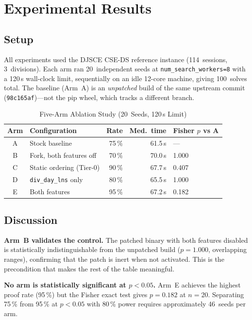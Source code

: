 \documentclass[conference]{IEEEtran}
\begin{document}
\section{Experimental Results}\label{sec:results}

\subsection{Setup}
All experiments used the DJSCE CSE-DS reference instance
(114~sessions, 3~divisions). Each arm ran 20~independent seeds at
\texttt{num\_search\_workers=8} with a 120\,s wall-clock limit, sequentially
on an idle 12-core machine, giving 100~solves total. The baseline (Arm~A) is
an \emph{unpatched} build of the same upstream commit
(\texttt{98c165af})---not the pip wheel, which tracks a different branch.

\begin{table}[t]
\centering
\caption{Five-Arm Ablation Study (20~Seeds, 120\,s Limit)}
\label{tab:ablation}
\begin{tabular}{clrrl}
\toprule
\textbf{Arm} & \textbf{Configuration} & \textbf{Rate} & \textbf{Med.\ time} & \textbf{Fisher $p$ vs A} \\
\midrule
A & Stock baseline              & 75\,\% & 61.5\,s & ---   \\
B & Fork, both features off     & 70\,\% & 70.0\,s & 1.000 \\
C & Static ordering (Tier-0)    & 90\,\% & 67.7\,s & 0.407 \\
D & \texttt{div\_day\_lns} only & 80\,\% & 65.5\,s & 1.000 \\
E & Both features               & 95\,\% & 67.2\,s & 0.182 \\
\bottomrule
\end{tabular}
\end{table}

\subsection{Discussion}
\textbf{Arm~B validates the control.} The patched binary with both features
disabled is statistically indistinguishable from the unpatched build
($p{=}1.000$, overlapping ranges), confirming that the patch is inert when
not activated. This is the precondition that makes the rest of the table
meaningful.

\textbf{No arm is statistically significant at $p{<}0.05$.} Arm~E achieves
the highest proof rate (95\,\%) but the Fisher exact test gives $p{=}0.182$
at $n{=}20$. Separating 75\,\% from 95\,\% at $p{<}0.05$ with 80\,\% power
requires approximately 46~seeds per arm.
\end{document}
